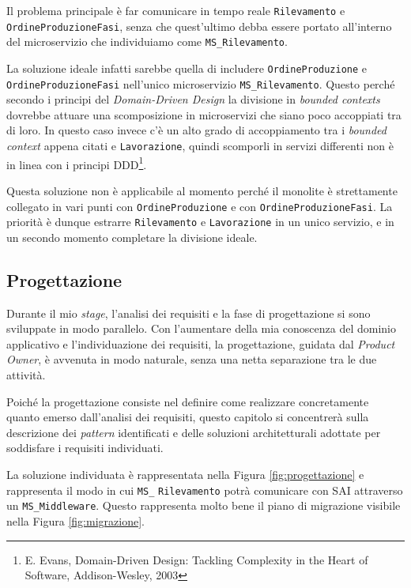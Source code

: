         \vspace{0.2 em}
        \noindent Il problema principale è far comunicare in tempo reale \texttt{Rilevamento} e \texttt{OrdineProduzioneFasi}, senza che quest'ultimo debba essere portato all'interno del microservizio che individuiamo come \texttt{MS\_Rilevamento}.

        \vspace{0.2 em}
        \noindent La soluzione ideale infatti sarebbe quella di includere \texttt{OrdineProduzione} e \texttt{OrdineProduzioneFasi} nell'unico microservizio \texttt{MS\_Rilevamento}. Questo perché secondo i principi del \textit{Domain-Driven Design} la divisione in \textit{bounded contexts} dovrebbe attuare una scomposizione in microservizi che siano poco accoppiati tra di loro. In questo caso invece c'è un alto grado di accoppiamento tra i \textit{bounded context} appena citati e  \texttt{Lavorazione}, quindi scomporli in servizi differenti non è in linea con i principi DDD\footnote{E. Evans, Domain-Driven Design: Tackling Complexity in the Heart of Software, Addison-Wesley, 2003}.

        \vspace{0.2 em}
        \noindent Questa soluzione non è applicabile al momento perché il monolite è strettamente collegato in vari punti con \texttt{OrdineProduzione} e con \texttt{OrdineProduzioneFasi}. La priorità è dunque estrarre \texttt{Rilevamento} e \texttt{Lavorazione} in un unico servizio, e in un secondo momento completare la divisione ideale.

        \subsection{Progettazione}
        Durante il mio \textit{stage}, l’analisi dei requisiti e la fase di progettazione si sono sviluppate in modo parallelo. Con l’aumentare della mia conoscenza del dominio applicativo e l’individuazione dei requisiti, la progettazione, guidata dal \textit{Product Owner}, è avvenuta in modo naturale, senza una netta separazione tra le due attività.  

        \vspace{0.2 em}
        \noindent Poiché la progettazione consiste nel definire come realizzare concretamente quanto emerso dall’analisi dei requisiti, questo capitolo si concentrerà sulla descrizione dei \textit{pattern} identificati e delle soluzioni architetturali adottate per soddisfare i requisiti individuati.

        \vspace{0.2 em}
        \noindent La soluzione individuata è rappresentata nella Figura \ref{fig:progettazione} e rappresenta il modo in cui \texttt{MS\_} \texttt{Rilevamento} potrà comunicare con SAI attraverso un \texttt{MS\_Middleware}. Questo rappresenta molto bene il piano di migrazione visibile nella Figura \ref{fig:migrazione}.
        
